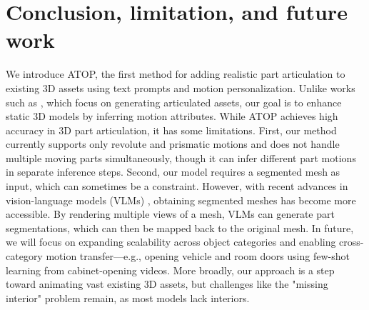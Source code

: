 \section{Conclusion, limitation, and future work}
\label{sec:future}
We introduce ATOP, the first method for adding realistic part articulation to existing 3D assets using text prompts and motion personalization. Unlike works such as \cite{liu2024cage, lei2023nap}, which focus on generating articulated assets, our goal is to enhance static 3D models by inferring motion attributes. While ATOP achieves high accuracy in 3D part articulation, it has some limitations. First, our method currently supports only revolute and prismatic motions and does not handle multiple moving parts simultaneously, though it can infer different part motions in separate inference steps. Second, our model requires a segmented mesh as input, which can sometimes be a constraint. However, with recent advances in vision-language models (VLMs) \cite{ravi2024sam2segmentimages, liu2023partslip, kim2024partstad}, obtaining segmented meshes has become more accessible. By rendering multiple views of a mesh, VLMs can generate part segmentations, which can then be mapped back to the original mesh. In future, we will focus on expanding scalability across object categories and enabling cross-category motion transfer—e.g., opening vehicle and room doors using few-shot learning from cabinet-opening videos. More broadly, our approach is a step toward animating vast existing 3D assets, but challenges like the "missing interior" problem remain, as most models lack interiors.